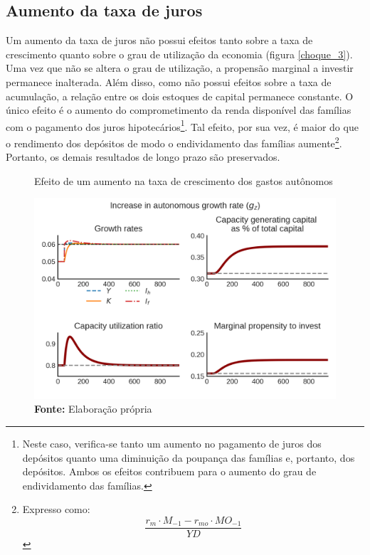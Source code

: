 \subsection*{Aumento da taxa de juros}

Um aumento da taxa de juros não possui efeitos tanto sobre a taxa de crescimento quanto sobre o grau de utilização da economia (figura \ref{choque_3}). Uma vez que não se altera o grau de utilização, a propensão marginal a investir permanece inalterada. Além disso, como não possui efeitos sobre a taxa de acumulação, 
a relação entre os dois estoques de capital permanece constante. O único efeito é o aumento do comprometimento da renda disponível das famílias com o pagamento dos juros hipotecários\footnote{Neste caso, verifica-se tanto um aumento no pagamento de juros dos depósitos quanto uma diminuição da poupança das famílias e, portanto, dos depósitos. Ambos os efeitos contribuem para o aumento do grau de endividamento das famílias.}. Tal efeito, por sua vez, é maior do que o rendimento dos depósitos de modo o endividamento das famílias aumente\footnote{Expresso como:
$$
\frac{r_m\cdot M_{-1} - r_{mo}\cdot MO_{-1}}{YD}
$$
}. Portanto, os demais resultados de longo prazo são preservados.


\begin{figure}[htb]
    \centering
    \label{choque_1}
    \caption{Efeito de um aumento na taxa de crescimento dos gastos autônomos}
    \includegraphics{Modelo/Shock_1.png}
    \caption*{\textbf{Fonte:} Elaboração própria}
\end{figure}


